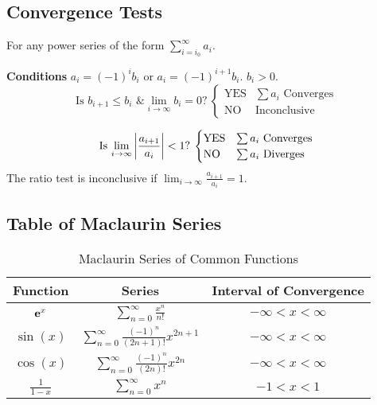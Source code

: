 \documentclass{article}
\begin{document}
\subsection{Convergence Tests}
For any power series of the form $\displaystyle\sum_{i=i_0}^\infty a_i$.
\begin{mdframed}[style=exampledefaultcols,frametitle={Alternating Series}]
    \textbf{Conditions} $a_i = \left( -1 \right)^i b_i$ or $a_i = \left( -1 \right)^{i+1} b_i$. $b_i>0$.
    \begin{equation*}
        \text{Is $b_{i+1}\leqslant b_i$ \& $\lim_{i\to\infty}b_i=0$?}\:
        \begin{cases}
            \text{YES} & \text{$\sum a_i$ Converges} \\
            \text{NO} & \text{Inconclusive}
        \end{cases}
    \end{equation*}
\end{mdframed}
\begin{mdframed}[style=exampledefaultcols,frametitle={Ratio Test}]
    \begin{equation*}
        \text{Is $\lim_{i\to\infty}\abs{\frac{a_{i+1}}{a_i}} < 1$?}\:
        \begin{cases}
            \text{YES} & \text{$\sum a_i$ Converges} \\
            \text{NO} & \text{$\sum a_i$ Diverges}
        \end{cases}
    \end{equation*}
    The ratio test is inconclusive if $\displaystyle \lim_{i\to\infty}\frac{a_{i+1}}{a_i} = 1$.
\end{mdframed}
\subsection{Table of Maclaurin Series}
\begin{table}[H]
    \centering
    \begin{tabular}{c | c | c}
        \toprule
        \textbf{Function} & \textbf{Series} & \textbf{Interval of Convergence} \\
        \midrule
        $\mathbf{e}^{x}$ & $\displaystyle \sum_{n=0}^{\infty} \frac{x^n}{n!}$ & $-\infty < x < \infty$ \\[14pt]
        $\sin{\left( x \right)}$ & $\displaystyle \sum_{n=0}^{\infty} \frac{\left( -1 \right)^n}{\left( 2n+1 \right)!} x^{2n+1}$ & $-\infty < x < \infty$ \\[14pt]
        $\cos{\left( x \right)}$ & $\displaystyle \sum_{n=0}^{\infty} \frac{\left( -1 \right)^n}{\left( 2n \right)!} x^{2n}$ & $-\infty < x < \infty$ \\[14pt]
        $\frac{1}{1-x}$ & $\displaystyle \sum_{n=0}^{\infty} x^n$ & $-1 < x < 1$ \\
        \bottomrule
    \end{tabular}
    \caption{Maclaurin Series of Common Functions}
\end{table}
\newpage
\end{document}
